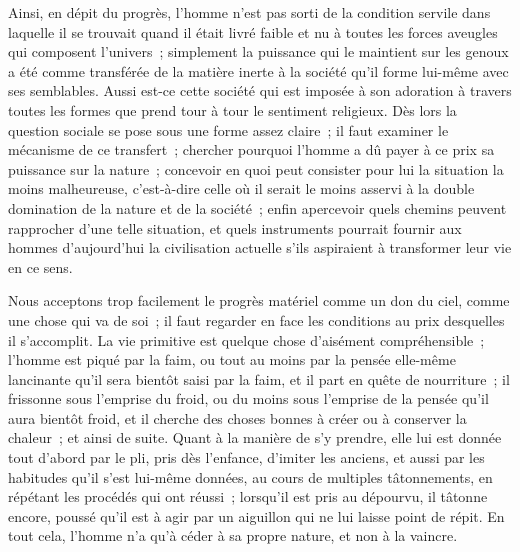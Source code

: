 \documentclass[french,twoside]{book} %
\begin{document}
Ainsi, en dépit du progrès, l'homme n'est pas sorti de la condition servile dans laquelle il se trouvait quand il était livré faible et nu à toutes les forces aveugles qui composent l'univers ; simplement la puissance qui le maintient sur les genoux a été comme transférée de la matière inerte à la société qu'il forme lui-même avec ses semblables. Aussi est-ce cette société qui est imposée à son adoration à travers toutes les formes que prend tour à tour le sentiment religieux. Dès lors la question sociale se pose sous une forme assez claire ; il faut examiner le mécanisme de ce transfert ; chercher pourquoi l'homme a dû payer à ce prix sa puissance sur la nature ; concevoir en quoi peut consister pour lui la situation la moins malheureuse, c'est-à-dire celle où il serait le moins asservi à la double domination de la nature et de la société ; enfin apercevoir quels chemins peuvent rapprocher d'une telle situation, et quels instruments pourrait fournir aux hommes d'aujourd'hui la civilisation actuelle s'ils aspiraient à transformer leur vie en ce sens.\par
Nous acceptons trop facilement le progrès matériel comme un don du ciel, comme une chose qui va de soi ; il faut regarder en face les conditions au prix desquelles il s'accomplit. La vie primitive est quelque chose d'aisément compréhensible ; l'homme est piqué par la faim, ou tout au moins par la pensée elle-même lancinante qu'il sera bientôt saisi par la faim, et il part en quête de nourriture ; il frissonne sous l'emprise du froid, ou du moins sous l'emprise de la pensée qu'il aura bientôt froid, et il cherche des choses bonnes à créer ou à conserver la chaleur ; et ainsi de suite. Quant à la manière de s'y prendre, elle lui est donnée tout d'abord par le pli, pris dès l'enfance, d'imiter les anciens, et aussi par les habitudes qu'il s'est lui-même données, au cours de multiples tâtonnements, en répétant les procédés qui ont réussi ; lorsqu'il est pris au dépourvu, il tâtonne encore, poussé qu'il est à agir par un aiguillon qui ne lui laisse point de répit. En tout cela, l'homme n'a qu'à céder à sa propre nature, et non à la vaincre.\par
\end{document}
